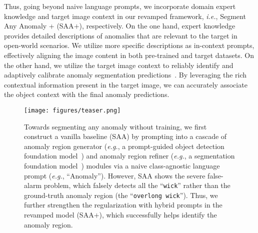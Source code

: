 Thus, going beyond naive language prompts, we incorporate domain expert knowledge and target image context in our revamped framework, \textit{i.e.}, Segment Any Anomaly + (SAA$+$), respectively.
On the one hand, expert knowledge provides detailed descriptions of anomalies that are relevant to the target in open-world scenarios. We utilize more specific descriptions as in-context prompts, effectively aligning the image content in both pre-trained and target datasets. On the other hand, we utilize the target image context to reliably identify and adaptively calibrate anomaly segmentation predictions~\cite{object_calibration, xu2022reliable}. By leveraging the rich contextual information present in the target image, we can accurately associate the object context with the final anomaly predictions. %

\begin{figure}[t]
  \centering
  \texttt{[image: figures/teaser.png]}
   \vspace{-5mm}
   \caption{Towards segmenting any anomaly without training, we first construct a vanilla baseline (SAA) by prompting into a cascade of anomaly region generator (\textit{e.g.}, a prompt-guided object detection foundation model~\cite{liu2023grounding}) and  anomaly region refiner (\textit{e.g.}, a segmentation foundation model~\cite{kirillov2023segment}) modules via a naive class-agnostic language prompt (\textit{e.g.}, ``Anomaly''). However, SAA shows the severe false-alarm problem, which falsely detects all the ``\texttt{\textcolor[RGB]{207,63,63}{wick}}'' rather than the ground-truth anomaly region (the ``\texttt{\textcolor[RGB]{112,173,71}{overlong wick}}''). Thus, we further strengthen the regularization with hybrid prompts in the revamped model (SAA$+$), which successfully helps identify the anomaly region.}
  \label{fig:teaser}
  \vspace{-1mm}
\end{figure}

